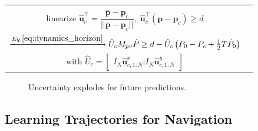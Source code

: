 \documentclass[letterpaper,conference,10pt]{IEEEconf}
\begin{document}
\begin{table}[ht]
\begin{tabular}{ c | c }
{            $\vert\vert \boldsymbol{p}_k - \boldsymbol{p}_{c_j,k}\vert\vert \geq d \quad \forall k\in\{1\dots N\}, j\in\{1\dots C\}$\\
            linearize $\hat{\boldsymbol{u}}^\intercal_c=\dfrac{\boldsymbol{\bar{p}}-\boldsymbol{p}_c}{\vert\vert \boldsymbol{\bar{p}}-\boldsymbol{p}_c\vert\vert}, \; \hat{\boldsymbol{u}}^\intercal_c(\boldsymbol{p}-\boldsymbol{p}_c)\geq d$\\
            $\xrightarrow{Eq. \ref{eq:dynamics_horizon}}\hat{U}_cM_{pv}\dot{P}\geq d-\hat{U}_c\left( P_0-P_c+\frac{1}{2}T\dot{P}_0\right)$\\
            with $\hat{U}_c=\begin{bmatrix}
                I_N\hat{\boldsymbol{u}}^x_{c,1:N} \vert I_N\hat{\boldsymbol{u}}^y_{c,1:N}
            \end{bmatrix}$
            } \\
    \hline
    \end{tabular}
\end{table}
\begin{figure}[ht]
    \centering
        \resizebox{7.2cm}{!}{}
    \caption{Uncertainty explodes for future predictions.}
    \label{fig:uncert}
\end{figure}

\subsection{Learning Trajectories for Navigation}\label{sec:prodmp}
\end{document}
